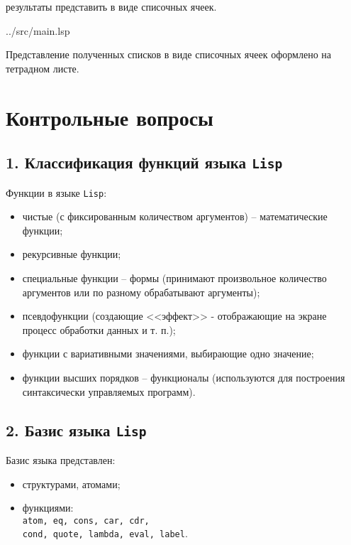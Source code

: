 результаты представить в виде списочных ячеек.

\begin{lstinputlisting}[
	caption={Задание 2},
	label={lst:t2},
	style={lsp},
	linerange={34-41},
	]{../src/main.lsp}
\end{lstinputlisting}

Представление полученных списков в виде списочных ячеек оформлено на тетрадном листе.

\section*{Контрольные вопросы}

\subsection*{1. Классификация функций языка {\texttt{Lisp}}}

Функции в языке {\texttt{Lisp}}:
\begin{itemize}
	\item чистые (с фиксированным количеством аргументов) -- математические функции;
	\item рекурсивные функции;
	\item специальные функции -- формы (принимают произвольное количество аргументов или по разному обрабатывают аргументы);
	\item псевдофункции (создающие <<эффект>> - отображающие на экране процесс обработки данных и т. п.);
	\item функции с вариативными значениями, выбирающие одно значение;
	\item функции высших порядков -- функционалы (используются для построения синтаксически управляемых программ).
\end{itemize}

\subsection*{2. Базис языка {\texttt{Lisp}}}

Базис языка представлен:
\begin{itemize}
	\item структурами, атомами;
	\item функциями:\\
	{\texttt{atom, eq, cons, car, cdr,}}\\
	{\texttt{cond, quote, lambda, eval, label}}.
\end{itemize}

